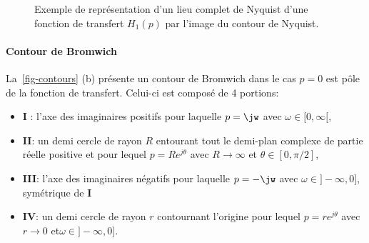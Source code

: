 \begin{figure}[!h]
    \caption{Exemple de représentation d'un lieu complet de Nyquist d'une fonction de transfert 
	$H_1(p)$ par l'image du contour de Nyquist. \label{fig-nyquist_complet_contour} }
\end{figure}

\paragraph{Contour de Bromwich}

La~\cref{fig-contours} (b) présente un contour de Bromwich dans le cas $p=0$ est pôle de la fonction de transfert. 
Celui-ci est composé de 4 portions:
\begin{itemize}
    \item \textbf{I} : l'axe des imaginaires positifs pour laquelle $p=\jw$ avec $\omega\in[0,\infty[$,
    \item \textbf{II}: un demi cercle de rayon $R$ entourant tout le demi-plan complexe de partie réelle positive 
        et pour lequel $p=Re^{j\theta}$ avec $R\rightarrow\infty$ et $\theta\in[0,\pi/2]$,
    \item \textbf{III}: l'axe des imaginaires négatifs  pour laquelle $p=-\jw$ avec $\omega\in]-\infty,0]$, symétrique de \textbf{I}
    \item \textbf{IV}:  un demi cercle de rayon $r$ contournant l'origine 
        pour lequel $p=re^{j\theta}$ avec $r\rightarrow0$ et$\omega\in]-\infty,0]$.
\end{itemize}

